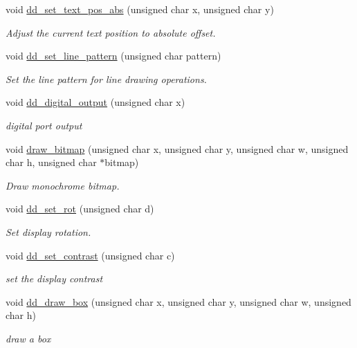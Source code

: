 \begin{DoxyCompactItemize}
void \hyperlink{group__display_gaf3ee28b3d5bad861fd1fea1b8e1ccd46}{dd\-\_\-set\-\_\-text\-\_\-pos\-\_\-abs} (unsigned char x, unsigned char y)
\begin{DoxyCompactList}\small\item\em \-Adjust the current text position to absolute offset. \end{DoxyCompactList}\item 
void \hyperlink{group__display_gaae519dd067406a1cc1eca1e1d25c1bc6}{dd\-\_\-set\-\_\-line\-\_\-pattern} (unsigned char pattern)
\begin{DoxyCompactList}\small\item\em \-Set the line pattern for line drawing operations. \end{DoxyCompactList}\item 
void \hyperlink{group__display_gaf1d94e3624be89a4d250604472673fa2}{dd\-\_\-digital\-\_\-output} (unsigned char x)
\begin{DoxyCompactList}\small\item\em digital port output \end{DoxyCompactList}\item 
void \hyperlink{group__display_ga17ea27854f28b826df824f8fb5b76ee7}{draw\-\_\-bitmap} (unsigned char x, unsigned char y, unsigned char w, unsigned char h, unsigned char $\ast$bitmap)
\begin{DoxyCompactList}\small\item\em \-Draw monochrome bitmap. \end{DoxyCompactList}\item 
void \hyperlink{group__display_gae6b8e55ba9a1e32f92d687c631d1ee6b}{dd\-\_\-set\-\_\-rot} (unsigned char d)
\begin{DoxyCompactList}\small\item\em \-Set display rotation. \end{DoxyCompactList}\item 
void \hyperlink{group__display_gada2afd62a98dcc9dd5f232209a5c996f}{dd\-\_\-set\-\_\-contrast} (unsigned char c)
\begin{DoxyCompactList}\small\item\em set the display contrast \end{DoxyCompactList}\item 
void \hyperlink{group__display_ga65e9f64a382ffdd6724e8412ef79c05f}{dd\-\_\-draw\-\_\-box} (unsigned char x, unsigned char y, unsigned char w, unsigned char h)
\begin{DoxyCompactList}\small\item\em draw a box \end{DoxyCompactList}\item 

\end{DoxyCompactItemize}

